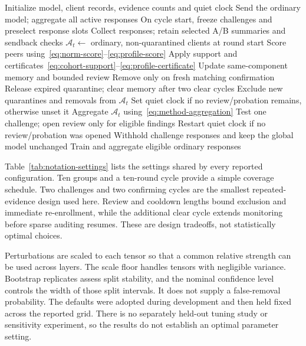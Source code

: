 \documentclass[journal]{IEEEtran}
\makeatletter
\renewcommand{\subsection}{\@startsection{subsection}{2}{\z@}{1.5ex}{0.7ex}{\normalfont\normalsize\itshape}}
\makeatother
\begin{document}
\begin{algorithm}[t]
\caption{Training with paired confirmation and bounded review}\label{alg:overall}
\begin{algorithmic}[1]\small
\State Initialize model, client records, evidence counts and quiet clock
  \State Send the ordinary model; aggregate all active responses
  \State On cycle start, freeze challenges and preselect response slots
  \State Collect responses; retain selected A/B summaries and sendback checks
  \State $\mathcal A_t\gets$ ordinary, non-quarantined clients at round start
   \State Score peers using~\eqref{eq:norm-score}--\eqref{eq:profile-score}
   \State Apply support and certificates~\eqref{eq:cohort-support}--\eqref{eq:profile-certificate}
   \State Update same-component memory and bounded review
   \State Remove only on fresh matching confirmation
   \State Release expired quarantine; clear memory after two clear cycles
   \State Exclude new quarantines and removals from $\mathcal A_t$
   \State Set quiet clock if no review/probation remains, otherwise unset it
  \EndIf
  \State Aggregate $\mathcal A_t$ using~\eqref{eq:method-aggregation}
  \State Test one challenge; open review only for eligible findings
  \State Restart quiet clock if no review/probation was opened
  \State Withhold challenge responses and keep the global model unchanged
 \Else
  \State Train and aggregate eligible ordinary responses
 \EndIf
\EndFor
\end{algorithmic}
\end{algorithm}

\subsection{Choice of Protocol Settings}
Table~\ref{tab:notation-settings} lists the settings shared by every
reported configuration. Ten groups and a ten-round cycle provide a simple
coverage schedule. Two challenges and two confirming cycles are the
smallest repeated-evidence design used here. Review and cooldown lengths
bound exclusion and immediate re-enrollment, while the additional clear
cycle extends monitoring before sparse auditing resumes. These are design tradeoffs,
not statistically optimal choices.

Perturbations are scaled to each tensor so that a common relative
strength can be used across layers. The scale floor handles tensors with
negligible variance. Bootstrap replicates assess split stability, and
the nominal confidence level controls the width of those split intervals.
It does not supply a false-removal probability. The defaults were adopted
during development and then held fixed across the reported grid. There
is no separately held-out tuning study or sensitivity experiment, so
the results do not establish an optimal parameter setting.
\end{document}
